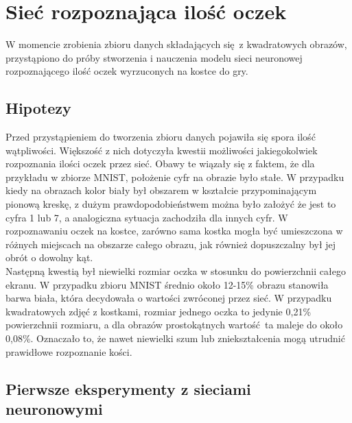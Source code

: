 
\chapter{Sieć rozpoznająca ilość oczek}
W momencie zrobienia zbioru danych składających się z kwadratowych obrazów, przystąpiono
do próby stworzenia i nauczenia modelu sieci neuronowej rozpoznającego ilość oczek
wyrzuconych na kostce do gry.

\section{Hipotezy}
Przed przystąpieniem do tworzenia zbioru danych pojawiła się spora ilość wątpliwości.
Większość z nich dotyczyła kwestii możliwości jakiegokolwiek rozpoznania ilości oczek
przez sieć. Obawy te wiązały się z faktem, że dla przykładu
w zbiorze MNIST, położenie cyfr na obrazie było stałe. W przypadku kiedy na obrazach
kolor biały był obszarem w kształcie przypominającym pionową kreskę, z dużym
prawdopodobieństwem można było założyć że jest to cyfra 1 lub 7, a analogiczna
sytuacja zachodziła dla innych cyfr. W rozpoznawaniu oczek na kostce, zarówno sama
kostka mogła być umieszczona w różnych miejscach na obszarze całego obrazu, jak również
dopuszczalny był jej obrót o dowolny kąt.\\
Następną kwestią był niewielki rozmiar oczka w stosunku do powierzchnii całego ekranu.
W przypadku zbioru MNIST średnio około 12-15\% obrazu stanowiła barwa biała, która
decydowała o wartości zwróconej przez sieć. W przypadku kwadratowych zdjęć z kostkami,
rozmiar jednego oczka to jedynie 0,21\% powierzchnii rozmiaru, a dla obrazów prostokątnych
wartość ta maleje do około 0,08\%. Oznaczało to, że nawet niewielki szum lub
zniekształcenia mogą utrudnić prawidłowe rozpoznanie kości.

\section{Pierwsze eksperymenty z sieciami neuronowymi}
